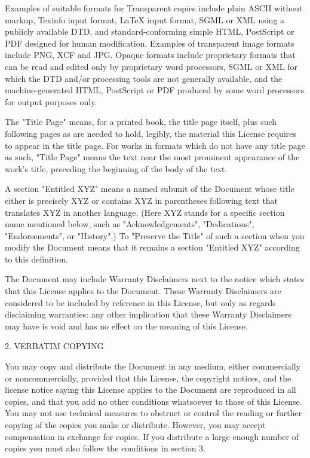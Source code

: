 \documentclass{article}
\begin{document}
Examples of suitable formats for Transparent copies include plain ASCII without markup, Texinfo input format, LaTeX input format, SGML or XML using a publicly available DTD, and standard-conforming simple HTML, PostScript or PDF designed for human modification.  Examples of transparent image formats include PNG, XCF and JPG. Opaque formats include proprietary formats that can be read and edited only by proprietary word processors, SGML or XML for which the DTD and/or processing tools are not generally available, and the machine-generated HTML, PostScript or PDF produced by some word processors for output purposes only. 

The "Title Page" means, for a printed book, the title page itself, plus such following pages as are needed to hold, legibly, the material this License requires to appear in the title page. For works in formats which do not have any title page as such, "Title Page" means the text near the most prominent appearance of the work's title, preceding the beginning of the body of the text. 

A section "Entitled XYZ" means a named subunit of the Document whose title either is precisely XYZ or contains XYZ in parentheses following text that translates XYZ in another language. (Here XYZ stands for a specific section name mentioned below, such as "Acknowledgements", "Dedications", "Endorsements", or "History".)  To "Preserve the Title" of such a section when you modify the Document means that it remains a section "Entitled XYZ" according to this definition. 

The Document may include Warranty Disclaimers next to the notice which states that this License applies to the Document. These Warranty Disclaimers are considered to be included by reference in this License, but only as regards disclaiming warranties: any other implication that these Warranty Disclaimers may have is void and has no effect on the meaning of this License. 

2. VERBATIM COPYING 

You may copy and distribute the Document in any medium, either commercially or noncommercially, provided that this License, the copyright notices, and the license notice saying this License applies to the Document are reproduced in all copies, and that you add no other conditions whatsoever to those of this License.  You may not use technical measures to obstruct or control the reading or further copying of the copies you make or distribute. However, you may accept compensation in exchange for copies. If you distribute a large enough number of copies you must also follow the conditions in section 3. 
\end{document}
